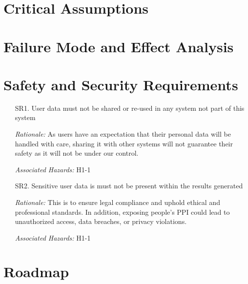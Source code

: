 \documentclass{article}
\begin{document}
\section{Critical Assumptions}


\section{Failure Mode and Effect Analysis}


\section{Safety and Security Requirements}

\begin{enumerate}

    \item[SR1.] User data must not be shared or re-used in any system not part of this system
    \item[] \emph{Rationale:}  As users have an expectation that their personal data will be handled with care, sharing it with other systems will not guarantee their safety as it will not be under our control.
    \item[] \emph{Associated Hazards:} H1-1

    \item[SR2.] Sensitive user data is must not be present within the results generated
    \item[] \emph{Rationale:}  This is to ensure legal compliance and uphold ethical and professional standards. In addition, exposing people's PPI could lead to unauthorized access, data breaches, or privacy violations.
    \item[] \emph{Associated Hazards:} H1-1
\end{enumerate}


\section{Roadmap}

\end{document}
